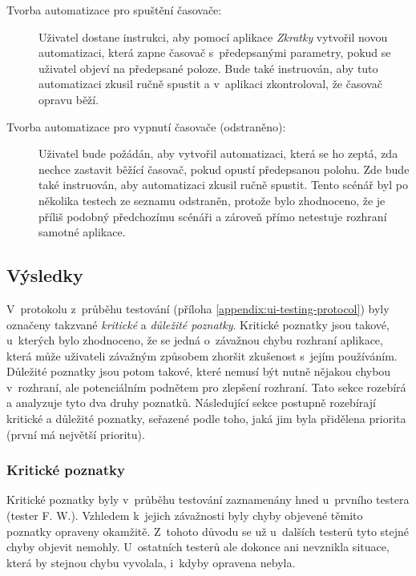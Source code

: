 \begin{description}
\item[Tvorba automatizace pro spuštění časovače:] Uživatel dostane instrukci, aby pomocí aplikace \emph{Zkratky} vytvořil novou automatizaci, která zapne časovač s~předepsanými parametry, pokud se uživatel objeví na předepsané poloze. Bude také instruován, aby tuto automatizaci zkusil ručně spustit a v~aplikaci zkontroloval, že časovač opravu běží.
\item[Tvorba automatizace pro vypnutí časovače (odstraněno):] Uživatel bude požádán, aby vytvořil automatizaci, která se ho zeptá, zda nechce zastavit běžící časovač, pokud opustí předepsanou polohu. Zde bude také instruován, aby automatizaci zkusil ručně spustit. Tento scénář byl po několika testech ze seznamu odstraněn, protože bylo zhodnoceno, že je příliš podobný předchozímu scénáři a zároveň přímo netestuje rozhraní samotné aplikace.
\end{description}

\subsection{Výsledky}\label{ui-testing-results}

V~protokolu z~průběhu testování (příloha \ref{appendix:ui-testing-protocol}) byly označeny takzvané \emph{kritické} a \emph{důležité poznatky}. Kritické poznatky jsou takové, u~kterých bylo zhodnoceno, že se jedná o~závažnou chybu rozhraní aplikace, která může uživateli závažným způsobem zhoršit zkušenost s~jejím používáním. Důležité poznatky jsou potom takové, které nemusí být nutně nějakou chybou v~rozhraní, ale potenciálním podnětem pro zlepšení rozhraní. Tato sekce rozebírá a analyzuje tyto dva druhy poznatků. Následující sekce postupně rozebírají kritické a důležité poznatky, seřazené podle toho, jaká jim byla přidělena priorita (první má největší prioritu).

\subsubsection{Kritické poznatky}

Kritické poznatky byly v~průběhu testování zaznamenány hned u~prvního testera (tester F. W.). Vzhledem k~jejich závažnosti byly chyby objevené těmito poznatky opraveny okamžitě. Z~tohoto důvodu se už u~dalších testerů tyto stejné chyby objevit nemohly. U~ostatních testerů ale dokonce ani nevznikla situace, která by stejnou chybu vyvolala, i~kdyby opravena nebyla.

